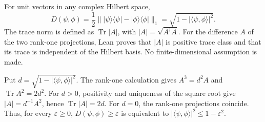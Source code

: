 \begin{theorem}\label{lem:pure-state-trace-distance}
  \par
  \leanok
  For unit vectors in any complex Hilbert space,
  \[
    D(\psi,\phi)=\frac12\bigl\||\psi\rangle\langle\psi|
      -|\phi\rangle\langle\phi|\bigr\|_1
      =\sqrt{1-|\langle\psi,\phi\rangle|^2}.
  \]
  The trace norm is defined as $\operatorname{Tr}|A|$, with
  $|A|=\sqrt{A^\dagger A}$. For the difference $A$ of the two rank-one
  projections, Lean proves that $|A|$ is positive trace class and that its
  trace is independent of the Hilbert basis. No finite-dimensional
  assumption is made.

  Put $d=\sqrt{1-|\langle\psi,\phi\rangle|^2}$.
  The rank-one calculation gives $A^3=d^2A$ and
  $\operatorname{Tr}A^2=2d^2$. For $d>0$, positivity and uniqueness of
  the square root give $|A|=d^{-1}A^2$, hence $\operatorname{Tr}|A|=2d$.
  For $d=0$, the rank-one projections coincide.
  Thus, for every $\varepsilon\ge0$, $D(\psi,\phi)\ge\varepsilon$
  is equivalent to $|\langle\psi,\phi\rangle|^2\le1-\varepsilon^2$.
\end{theorem}


